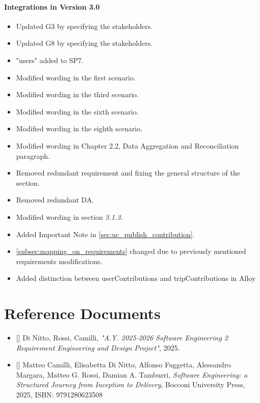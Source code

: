 \paragraph{Integrations in Version 3.0}
\begin{itemize}

    \item Updated G3 by specifying the stakeholders.
    \item Updated G8 by specifying the stakeholders.
    \item "users" added to SP7.
    \item Modified wording in the first scenario. 
    \item Modified wording in the third scenario.
    \item Modified wording in the sixth scenario.
    \item Modified wording in the eighth scenario. 
    \item Modified wording in Chapter 2.2, Data Aggregation and Reconciliation paragraph.
    \item Removed redundant requirement and fixing the general structure of the section.
    \item Removed redundant DA.
    \item Modified wording in section \textit{3.1.3}. 
    \item Added Important Note in \ref{sec:uc_publish_contribution}.
    \item \ref{subsec:mapping_on_requirements} changed due to previously mentioned requirements modifications.
     \item Added distinction between userContributions and tripContributions in Alloy


    
\end{itemize}
\setcounter{bib}{1}
\newcommand{\cbib} {\thebib\stepcounter{bib}}

\section{Reference Documents}
\label{sec:reference_documents}
\begin{itemize}
    \item{[\cbib]} Di Nitto, Rossi, Camilli, \textit{"A.Y. 2025-2026 Software Engineering 2 Requirement Engineering and Design Project"}, 2025.
    \item{[\cbib]} Matteo Camilli, Elisabetta Di Nitto, Alfonso Fuggetta, Alessandro Margara, Matteo G. Rossi, Damian A. Tamburri, \textit{Software Engineering: a Structured Journey from Inception to Delivery}, Bocconi University Press, 2025, ISBN: 9791280623508
\end{itemize}

